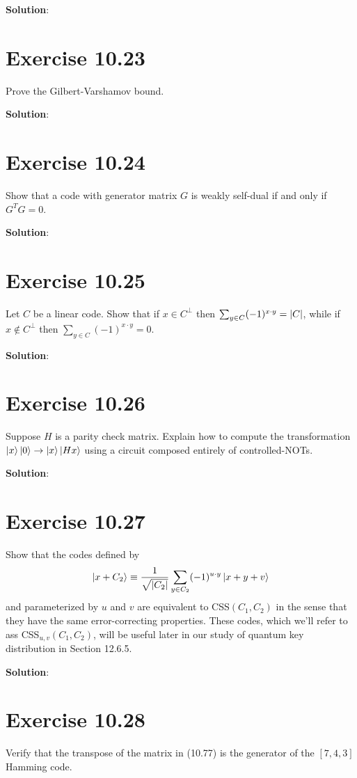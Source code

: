 \documentclass{book}
\begin{document}
    \textbf{Solution}:

\section*{Exercise 10.23}
    Prove the Gilbert-Varshamov bound. 

    \textbf{Solution}:

\section*{Exercise 10.24}
    Show that a code with generator matrix $G$ is weakly self-dual if and only if $G^T G = 0$. 

    \textbf{Solution}:

\section*{Exercise 10.25}
    Let $C$ be a linear code. Show that if $x \in C^\perp$ then $\sum_{y\in C} (-1)^{x\cdot y} = \abs{C}$, while if $x \notin C^\perp$ then $\sum_{y\in C} (-1)^{x\cdot y} = 0$.

    \textbf{Solution}:

\section*{Exercise 10.26}
    Suppose $H$ is a parity check matrix. Explain how to compute the transformation $\ket{x}\ket{0} \to \ket{x}\ket{Hx}$ using a circuit composed entirely of controlled-NOTs. 

    \textbf{Solution}:

\section*{Exercise 10.27}
    Show that the codes defined by
    \begin{align}
        \ket{x+C_2} \equiv \frac{1}{\sqrt{\abs{C_2}}} \sum_{y\in C_2} (-1)^{u\cdot y} \ket{x+y+v}
    \end{align}
    and parameterized by $u$ and $v$ are equivalent to CSS$(C_1, C_2)$ in the sense that they have the same error-correcting properties. These codes, which we'll refer to ass CSS$_{u,v}(C_1, C_2)$, will be useful later in our study of quantum key distribution in Section 12.6.5.

    \textbf{Solution}:

\section*{Exercise 10.28}
    Verify that the transpose of the matrix in (10.77) is the generator of the $[7,4,3]$ Hamming code. 
\end{document}
